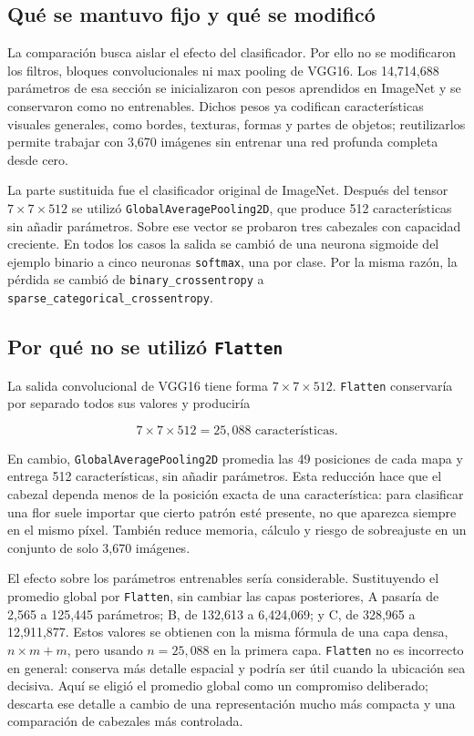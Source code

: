 \documentclass[11pt,letterpaper]{article}
\begin{document}
\subsection{Qué se mantuvo fijo y qué se modificó}
La comparación busca aislar el efecto del clasificador. Por ello no se
modificaron los filtros, bloques convolucionales ni max pooling de VGG16. Los
14,714,688 parámetros de esa sección se inicializaron con pesos aprendidos en
ImageNet y se conservaron como no entrenables. Dichos pesos ya codifican
características visuales generales, como bordes, texturas, formas y partes de
objetos; reutilizarlos permite trabajar con 3,670 imágenes sin entrenar una red
profunda completa desde cero.

La parte sustituida fue el clasificador original de ImageNet. Después del
tensor $7\times7\times512$ se utilizó \texttt{GlobalAveragePooling2D}, que
produce 512 características sin añadir parámetros. Sobre ese vector se
probaron tres cabezales con capacidad creciente. En todos los casos la salida
se cambió de una neurona sigmoide del ejemplo binario a cinco neuronas
\texttt{softmax}, una por clase. Por la misma razón, la pérdida se cambió de
\texttt{binary\_crossentropy} a
\texttt{sparse\_categorical\_crossentropy}.

\subsection{Por qué no se utilizó \texttt{Flatten}}
La salida convolucional de VGG16 tiene forma $7\times7\times512$.
\texttt{Flatten} conservaría por separado todos sus valores y produciría

\[
7\times7\times512=25,088\text{ características}.
\]

En cambio, \texttt{GlobalAveragePooling2D} promedia las 49 posiciones de cada
mapa y entrega 512 características, sin añadir parámetros. Esta reducción
hace que el cabezal dependa menos de la posición exacta de una característica:
para clasificar una flor suele importar que cierto patrón esté presente, no
que aparezca siempre en el mismo píxel. También reduce memoria, cálculo y
riesgo de sobreajuste en un conjunto de solo 3,670 imágenes.

El efecto sobre los parámetros entrenables sería considerable. Sustituyendo
el promedio global por \texttt{Flatten}, sin cambiar las capas posteriores, A
pasaría de 2,565 a 125,445 parámetros; B, de 132,613 a 6,424,069; y C, de
328,965 a 12,911,877. Estos valores se obtienen con la misma fórmula de una
capa densa, $n\times m+m$, pero usando $n=25,088$ en la primera capa.
\texttt{Flatten} no es incorrecto en general: conserva más detalle espacial y
podría ser útil cuando la ubicación sea decisiva. Aquí se eligió el promedio
global como un compromiso deliberado; descarta ese detalle a cambio de una
representación mucho más compacta y una comparación de cabezales más
controlada.
\end{document}
